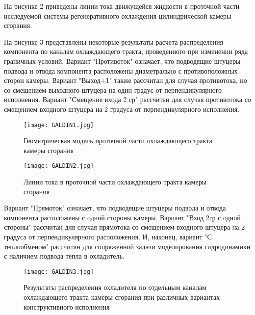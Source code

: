 На рисунке 2 приведены линии тока движущейся жидкости в проточной части исследуемой системы регенеративного охлаждения цилиндрической камеры сгорания.

На рисунке 3 представлены некоторые результаты расчета распределения компонента по каналам охлаждающего тракта, проведенного при изменении ряда граничных условий. Вариант "Противоток" означает, что подводящие штуцеры подвода и отвода компонента расположены диаметрально с противоположных сторон камеры. Вариант "Выход+1" также рассчитан для случая противотока, но со смещением выходного штуцера на один градус от перпендикулярного исполнения. Вариант "Смещение входа 2 гр" рассчитан для случая противотока со смещением входного штуцера на 2 градуса от перпендикулярного исполнения.

\begin{figure}
	\centering
	\texttt{[image: GALDIN1.jpg]}
	\caption{Геометрическая модель проточной части охлаждающего тракта камеры сгорания}
\end{figure}

\begin{figure}
	\centering
	\texttt{[image: GALDIN2.jpg]}
	\caption{Линии тока в проточной части охлаждающего тракта камеры сгорания}
\end{figure}

Вариант "Прямоток" означает, что подводящие штуцеры подвода и отвода компонента расположены с одной стороны камеры. Вариант "Вход 2гр с одной стороны" рассчитан для случая прямотока со смещением входного штуцера на 2 градуса от перпендикулярного расположения. И, наконец, вариант "С теплообменом" рассчитан для сопряженной задачи моделирования гидродинамики с наличием подвода тепла в охладитель.
\begin{figure}
	\centering
	\texttt{[image: GALDIN3.jpg]}
	\caption{Результаты распределения охладителя по отдельным каналам охлаждающего тракта камеры сгорания при различных вариантах конструктивного исполнения}
\end{figure}


